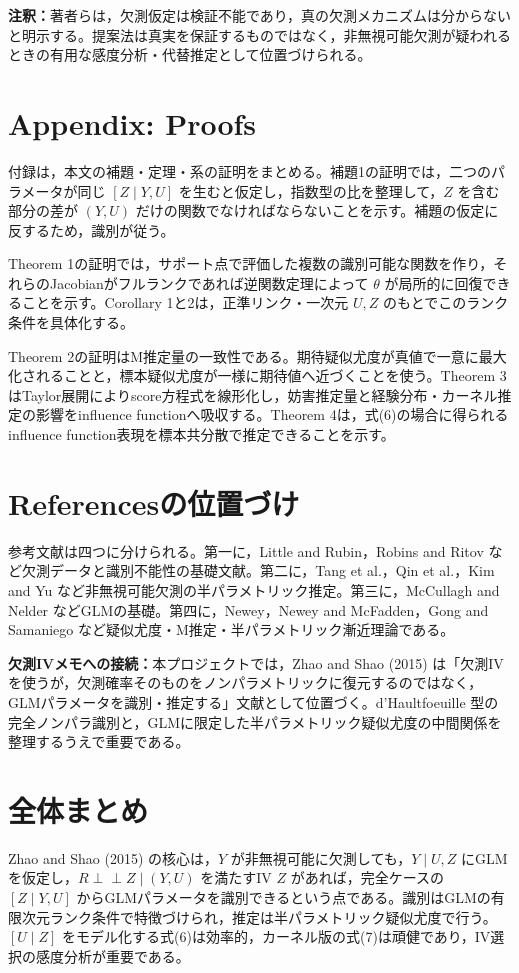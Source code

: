 \documentclass[dvipdfmx,autodetect-engine]{jsarticle}
\newcommand{\indep}{\mathrel{\perp\!\!\!\perp}}
\newcommand{\note}[1]{\par\smallskip\noindent\textbf{注釈：}#1\par\smallskip}
\newcommand{\connect}[1]{\par\smallskip\noindent\textbf{欠測IVメモへの接続：}#1\par\smallskip}
\begin{document}
\note{著者らは，欠測仮定は検証不能であり，真の欠測メカニズムは分からないと明示する。提案法は真実を保証するものではなく，非無視可能欠測が疑われるときの有用な感度分析・代替推定として位置づけられる。}

\section{Appendix: Proofs}

付録は，本文の補題・定理・系の証明をまとめる。補題1の証明では，二つのパラメータが同じ $[Z\mid Y,U]$ を生むと仮定し，指数型の比を整理して，$Z$ を含む部分の差が $(Y,U)$ だけの関数でなければならないことを示す。補題の仮定に反するため，識別が従う。

Theorem 1の証明では，サポート点で評価した複数の識別可能な関数を作り，それらのJacobianがフルランクであれば逆関数定理によって $\theta$ が局所的に回復できることを示す。Corollary 1と2は，正準リンク・一次元 $U,Z$ のもとでこのランク条件を具体化する。

Theorem 2の証明はM推定量の一致性である。期待疑似尤度が真値で一意に最大化されることと，標本疑似尤度が一様に期待値へ近づくことを使う。Theorem 3はTaylor展開によりscore方程式を線形化し，妨害推定量と経験分布・カーネル推定の影響をinfluence functionへ吸収する。Theorem 4は，式(6)の場合に得られるinfluence function表現を標本共分散で推定できることを示す。

\section{Referencesの位置づけ}

参考文献は四つに分けられる。第一に，Little and Rubin，Robins and Ritov など欠測データと識別不能性の基礎文献。第二に，Tang et al.，Qin et al.，Kim and Yu など非無視可能欠測の半パラメトリック推定。第三に，McCullagh and Nelder などGLMの基礎。第四に，Newey，Newey and McFadden，Gong and Samaniego など疑似尤度・M推定・半パラメトリック漸近理論である。

\connect{本プロジェクトでは，Zhao and Shao (2015) は「欠測IVを使うが，欠測確率そのものをノンパラメトリックに復元するのではなく，GLMパラメータを識別・推定する」文献として位置づく。d'Haultfoeuille 型の完全ノンパラ識別と，GLMに限定した半パラメトリック疑似尤度の中間関係を整理するうえで重要である。}

\section*{全体まとめ}

Zhao and Shao (2015) の核心は，$Y$ が非無視可能に欠測しても，$Y\mid U,Z$ にGLMを仮定し，$R\indep Z\mid(Y,U)$ を満たすIV $Z$ があれば，完全ケースの $[Z\mid Y,U]$ からGLMパラメータを識別できるという点である。識別はGLMの有限次元ランク条件で特徴づけられ，推定は半パラメトリック疑似尤度で行う。$[U\mid Z]$ をモデル化する式(6)は効率的，カーネル版の式(7)は頑健であり，IV選択の感度分析が重要である。
\end{document}
